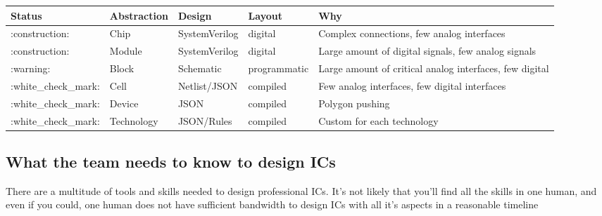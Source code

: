 \begin{longtable}[]{@{}
  >{\raggedright\arraybackslash}p{}
  >{\raggedright\arraybackslash}p{}
  >{\raggedright\arraybackslash}p{}
  >{\raggedright\arraybackslash}p{}
  >{\raggedright\arraybackslash}p{}@{}}
\toprule\noalign{}
\begin{minipage}[b]{\linewidth}\raggedright
Status
\end{minipage} & \begin{minipage}[b]{\linewidth}\raggedright
Abstraction
\end{minipage} & \begin{minipage}[b]{\linewidth}\raggedright
Design
\end{minipage} & \begin{minipage}[b]{\linewidth}\raggedright
Layout
\end{minipage} & \begin{minipage}[b]{\linewidth}\raggedright
Why
\end{minipage} \\
\midrule\noalign{}
\endhead
\bottomrule\noalign{}
\endlastfoot
:construction: & Chip & SystemVerilog & digital & Complex connections,
few analog interfaces \\
:construction: & Module & SystemVerilog & digital & Large amount of
digital signals, few analog signals \\
:warning: & Block & Schematic & programmatic & Large amount of critical
analog interfaces, few digital \\
:white\_check\_mark: & Cell & Netlist/JSON & compiled & Few analog
interfaces, few digital interfaces \\
:white\_check\_mark: & Device & JSON & compiled & Polygon pushing \\
:white\_check\_mark: & Technology & JSON/Rules & compiled & Custom for
each technology \\
\end{longtable}

\subsection{What the team needs to know to design
ICs}\label{what-the-team-needs-to-know-to-design-ics}

There are a multitude of tools and skills needed to design professional
ICs. It's not likely that you'll find all the skills in one human, and
even if you could, one human does not have sufficient bandwidth to
design ICs with all it's aspects in a reasonable timeline

